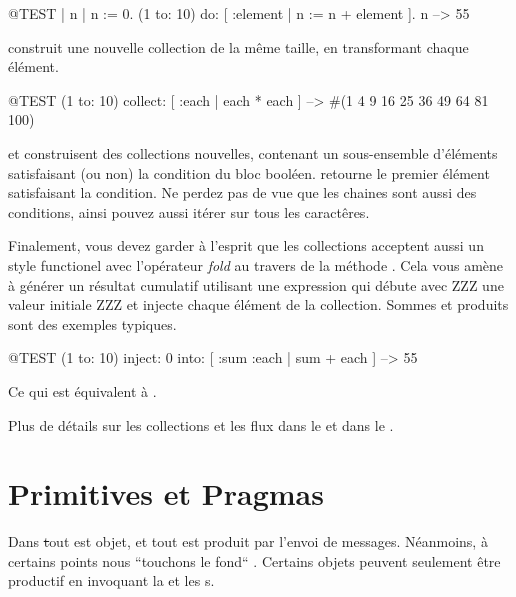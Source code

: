 \documentclass[a4paper,10pt,twoside]{book}
\begin{document}
\begin{code}{@TEST | n |}
n := 0.
(1 to: 10) do: [ :element | n := n + element ].
n --> 55
\end{code}

 construit une nouvelle collection de la m\^{e}me taille, en transformant chaque \'{e}l\'{e}ment.
\begin{code}{@TEST}
(1 to: 10) collect: [ :each | each * each ] --> #(1 4 9 16 25 36 49 64 81 100)
\end{code}

 et  construisent des collections nouvelles, contenant un sous-ensemble d'\'{e}l\'{e}ments satisfaisant (ou non) la condition du bloc bool\'{e}en.
 retourne le premier \'{e}l\'{e}ment satisfaisant la condition.
Ne perdez pas de vue que les chaines sont aussi des conditions, ainsi pouvez 
aussi it\'{e}rer sur tous les caract\^{e}res.


Finalement, vous devez garder \`{a} l'esprit que les collections acceptent aussi un style  functionel avec l'op\'{e}rateur \emph{fold} au travers de la m\'{e}thode .
Cela vous am\`{e}ne \`{a} g\'{e}n\'{e}rer un r\'{e}sultat cumulatif  utilisant une expression qui d\'{e}bute avec ZZZ une valeur initiale ZZZ et injecte chaque \'{e}l\'{e}ment de la collection.
Sommes et produits sont des exemples typiques.

\begin{code}{@TEST}
(1 to: 10) inject: 0 into: [ :sum :each | sum + each ] --> 55
\end{code}

\noindent
Ce qui est \'{e}quivalent \`{a} .

Plus de d\'{e}tails sur les collections et les flux dans le  et dans le .

\section{Primitives et Pragmas}

Dans \st tout est objet, et tout est produit par l'envoi de messages.
N\'{e}anmoins, \`{a} certains points nous ``touchons le fond`` .
Certains objets peuvent seulement \^{e}tre productif en invoquant la  et les s.
\end{document}
